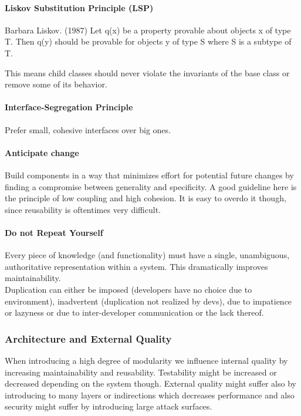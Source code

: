 \paragraph{Liskov Substitution Principle (LSP)}
\begin{chapquote}{Barbara Liskov. (1987)}
    Let q(x) be a property provable about objects x of type T. Then q(y) should
be provable for objects y of type S where S is a subtype of T.
\end{chapquote}
This means child classes should never violate the invariants of the base class or remove some of its behavior.

\paragraph{Interface-Segregation Principle}
Prefer small, cohesive interfaces over big ones.

\paragraph{Anticipate change}
Build components in a way that minimizes effort for potential future changes by finding a compromise between generality and specificity.
A good guideline here is the principle of low coupling and high cohesion.
It is easy to overdo it though, since reusability is oftentimes very difficult.

\paragraph{Do not Repeat Yourself}
Every piece of knowledge (and functionality) must have a single, unambiguous, authoritative representation within a system.
This dramatically improves maintainability.\\
Duplication can either be imposed (developers have no choice due to environment), inadvertent (duplication not realized by devs), due to impatience or lazyness or due to inter-developer communication or the lack thereof.

\subsubsection{Architecture and External Quality}
When introducing a high degree of modularity we influence internal quality by increasing maintainability and reusability.
Testability might be increased or decreased depending on the system though.
External quality might suffer also by introducing to many layers or indirections
which decreases performance and also security might suffer by introducing large attack surfaces.\\

